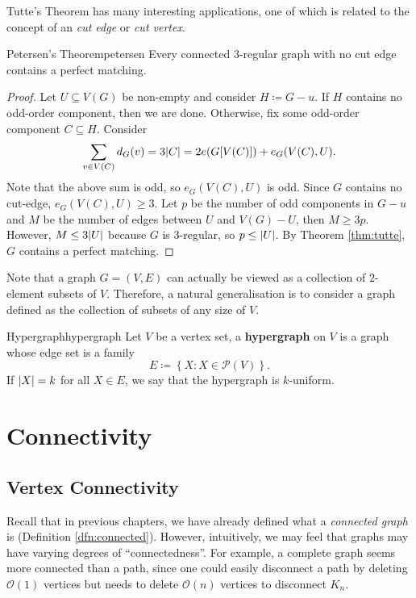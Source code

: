 \documentclass[math, code]{amznotes}
\theoremstyle{remark}
\begin{document}
Tutte's Theorem has many interesting applications, one of which is related to the concept of an \textit{cut edge} or \textit{cut vertex}.
\begin{thmbox}{Petersen's Theorem}{petersen}
    Every connected $3$-regular graph with no cut edge contains a perfect matching.
    \tcblower
    \begin{proof}
        Let $U \subseteq V(G)$ be non-empty and consider $H \coloneqq G - u$. If $H$ contains no odd-order component, then we are done. Otherwise, fix some odd-order component $C \subseteq H$. Consider
        \begin{equation*}
            \sum_{v \in V(C)}d_G(v) = 3{\left\lvert {C} \right\rvert} = 2e(G[V(C)]) + e_G(V(C), U).
        \end{equation*}
        Note that the above sum is odd, so $e_G(V(C), U)$ is odd. Since $G$ contains no cut-edge, $e_G(V(C), U) \geq 3$. Let $p$ be the number of odd components in $G - u$ and $M$ be the number of edges between $U$ and $V(G) - U$, then $M \geq 3p$. However, $M \leq 3{\left\lvert {U} \right\rvert}$ because $G$ is $3$-regular, so $p \leq {\left\lvert {U} \right\rvert}$. By Theorem \ref{thm:tutte}, $G$ contains a perfect matching.
    \end{proof}
\end{thmbox}
Note that a graph $G = (V, E)$ can actually be viewed as a collection of $2$-element subsets of $V$. Therefore, a natural generalisation is to consider a graph defined as the collection of subsets of any size of $V$.
\begin{dfnbox}{Hypergraph}{hypergraph}
    Let $V$ be a vertex set, a {\color{red} \textbf{hypergraph}} on $V$ is a graph whose edge set is a family
    \begin{equation*}
        E \coloneqq \left\{X \colon X \in \mathcal{P}(V)\right\}.
    \end{equation*}
    If ${\left\lvert {X} \right\rvert} = k$ for all $X \in E$, we say that the hypergraph is $k$-uniform.
\end{dfnbox}
\chapter{Connectivity}
\section{Vertex Connectivity}
Recall that in previous chapters, we have already defined what a \textit{connected graph} is (Definition \ref{dfn:connected}). However, intuitively, we may feel that graphs may have varying degrees of ``connectedness''. For example, a complete graph seems more connected than a path, since one could easily disconnect a path by deleting $\mathcal{O}(1)$ vertices but needs to delete $\mathcal{O}(n)$ vertices to disconnect $K_n$.
\end{document}
